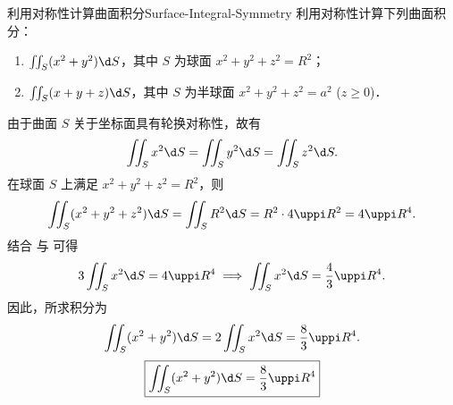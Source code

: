 \begin{problem}{利用对称性计算曲面积分}{Surface-Integral-Symmetry}
    利用对称性计算下列曲面积分：
    \begin{enumerate}
        \item $\iint_{S} (x^2 + y^2) \d S$，其中 $S$ 为球面 $x^2 + y^2 + z^2 = R^2$；
        \item $\iint_{S} (x + y + z) \d S$，其中 $S$ 为半球面 $x^2 + y^2 + z^2 = a^2$ ($z \ge 0$)．
    \end{enumerate}
\end{problem}

\begin{solution}

    由于曲面 $S$ 关于坐标面具有轮换对称性，故有
    \begin{equation}
        \iint_{S} x^2 \d S = \iint_{S} y^2 \d S = \iint_{S} z^2 \d S. \label{eq:symmetry-1}
    \end{equation}
    在球面 $S$ 上满足 $x^2 + y^2 + z^2 = R^2$，则
    \begin{equation}
        \iint_{S} (x^2 + y^2 + z^2) \d S = \iint_{S} R^2 \d S = R^2 \cdot 4\uppi R^2 = 4\uppi R^4. \label{eq:total-integral}
    \end{equation}
    结合  与  可得
    \begin{equation}
        3 \iint_{S} x^2 \d S = 4\uppi R^4 \implies \iint_{S} x^2 \d S = \frac{4}{3}\uppi R^4.
    \end{equation}
    因此，所求积分为
    \begin{equation}
        \iint_{S} (x^2 + y^2) \d S = 2 \iint_{S} x^2 \d S = \frac{8}{3}\uppi R^4.
    \end{equation}
    \begin{equation}
        \boxed{\iint_{S} (x^2 + y^2) \d S = \frac{8}{3}\uppi R^4}
    \end{equation}



\end{solution}
